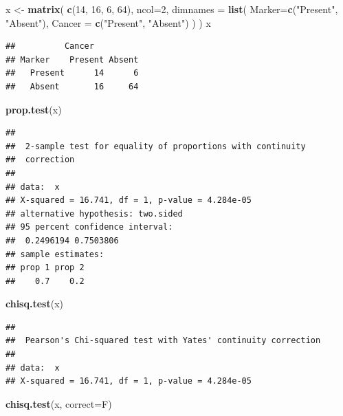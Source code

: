 \documentclass[]{book}
\newenvironment{Shaded}{\begin{snugshade}}{\end{snugshade}}
\newcommand{\DataTypeTok}[1]{\textcolor[rgb]{0.13,0.29,0.53}{#1}}
\newcommand{\DecValTok}[1]{\textcolor[rgb]{0.00,0.00,0.81}{#1}}
\newcommand{\KeywordTok}[1]{\textcolor[rgb]{0.13,0.29,0.53}{\textbf{#1}}}
\newcommand{\NormalTok}[1]{#1}
\newcommand{\StringTok}[1]{\textcolor[rgb]{0.31,0.60,0.02}{#1}}
\begin{document}
\begin{Shaded}
\begin{Highlighting}[]
\NormalTok{x <-}\StringTok{ }\KeywordTok{matrix}\NormalTok{(}
  \KeywordTok{c}\NormalTok{(}\DecValTok{14}\NormalTok{, }\DecValTok{16}\NormalTok{, }\DecValTok{6}\NormalTok{, }\DecValTok{64}\NormalTok{), }
  \DataTypeTok{ncol=}\DecValTok{2}\NormalTok{, }
  \DataTypeTok{dimnames =} \KeywordTok{list}\NormalTok{(}
    \DataTypeTok{Marker=}\KeywordTok{c}\NormalTok{(}\StringTok{"Present"}\NormalTok{, }\StringTok{"Absent"}\NormalTok{), }
    \DataTypeTok{Cancer =} \KeywordTok{c}\NormalTok{(}\StringTok{"Present"}\NormalTok{, }\StringTok{"Absent"}\NormalTok{)}
\NormalTok{    )}
\NormalTok{  )}
\NormalTok{x}
\end{Highlighting}
\end{Shaded}

\begin{verbatim}
##          Cancer
## Marker    Present Absent
##   Present      14      6
##   Absent       16     64
\end{verbatim}

\begin{Shaded}
\begin{Highlighting}[]
\KeywordTok{prop.test}\NormalTok{(x)}
\end{Highlighting}
\end{Shaded}

\begin{verbatim}
## 
##  2-sample test for equality of proportions with continuity
##  correction
## 
## data:  x
## X-squared = 16.741, df = 1, p-value = 4.284e-05
## alternative hypothesis: two.sided
## 95 percent confidence interval:
##  0.2496194 0.7503806
## sample estimates:
## prop 1 prop 2 
##    0.7    0.2
\end{verbatim}

\begin{Shaded}
\begin{Highlighting}[]
\KeywordTok{chisq.test}\NormalTok{(x)}
\end{Highlighting}
\end{Shaded}

\begin{verbatim}
## 
##  Pearson's Chi-squared test with Yates' continuity correction
## 
## data:  x
## X-squared = 16.741, df = 1, p-value = 4.284e-05
\end{verbatim}

\begin{Shaded}
\begin{Highlighting}[]
\KeywordTok{chisq.test}\NormalTok{(x, }\DataTypeTok{correct=}\NormalTok{F)}
\end{Highlighting}
\end{Shaded}
\end{document}
